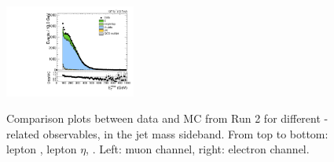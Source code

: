 \begin{figure}[htbp]
  \includegraphics[width=0.3825\textwidth]{fig/controlPlots/SB_b1_e_allP_allC_allD_Run2_met_pt.pdf}\\
  \caption{
    Comparison plots between data and MC from Run 2 for different \Wlep-related observables, in the jet mass sideband.
    From top to bottom: lepton \pt, lepton $\eta$, \ptmiss.
    Left: muon channel, right: electron channel.
  }
  \label{fig:SB_controlPlotsRun2_1}
\end{figure}


